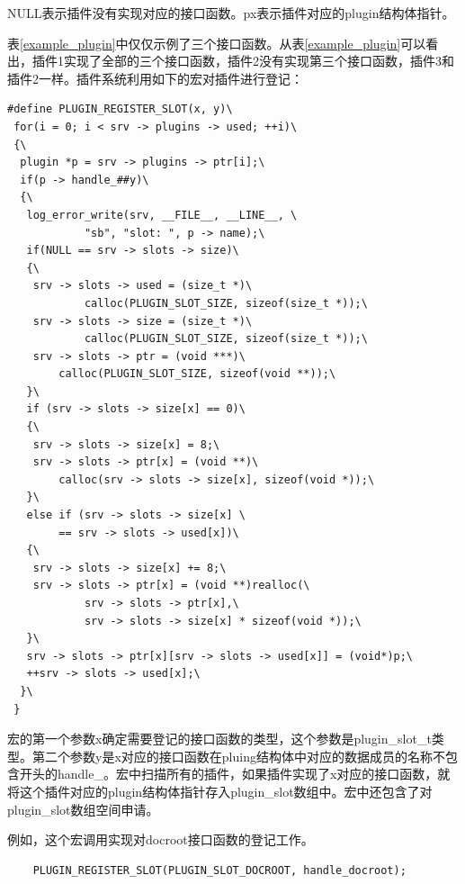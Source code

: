 \documentclass[twoside, xetex]{report}
\begin{document}
	NULL表示插件没有实现对应的接口函数。px表示插件对应的plugin结构体指针。
	
	表\ref{example_plugin}中仅仅示例了三个接口函数。从表\ref{example_plugin}可以看出，插件1实现了全部的三个接口函数，插件2没有实现第三个接口函数，插件3和插件2一样。插件系统利用如下的宏对插件进行登记：
	
\begin{verbatim}
#define PLUGIN_REGISTER_SLOT(x, y)\
 for(i = 0; i < srv -> plugins -> used; ++i)\
 {\
  plugin *p = srv -> plugins -> ptr[i];\
  if(p -> handle_##y)\
  {\
   log_error_write(srv, __FILE__, __LINE__, \
   			"sb", "slot: ", p -> name);\
   if(NULL == srv -> slots -> size)\
   {\
    srv -> slots -> used = (size_t *)\
    		calloc(PLUGIN_SLOT_SIZE, sizeof(size_t *));\
    srv -> slots -> size = (size_t *)\
    		calloc(PLUGIN_SLOT_SIZE, sizeof(size_t *));\
	srv -> slots -> ptr = (void ***)\
		calloc(PLUGIN_SLOT_SIZE, sizeof(void **));\
   }\
   if (srv -> slots -> size[x] == 0)\
   {\
	srv -> slots -> size[x] = 8;\
	srv -> slots -> ptr[x] = (void **)\
		calloc(srv -> slots -> size[x], sizeof(void *));\
   }\
   else if (srv -> slots -> size[x] \
   		== srv -> slots -> used[x])\
   {\
	srv -> slots -> size[x] += 8;\
	srv -> slots -> ptr[x] = (void **)realloc(\
			srv -> slots -> ptr[x],\
			srv -> slots -> size[x] * sizeof(void *));\
   }\
   srv -> slots -> ptr[x][srv -> slots -> used[x]] = (void*)p;\
   ++srv -> slots -> used[x];\
  }\
 }
\end{verbatim}

	宏的第一个参数x确定需要登记的接口函数的类型，这个参数是plugin\_slot\_t类型。第二个参数y是x对应的接口函数在pluing结构体中对应的数据成员的名称不包含开头的handle\_。宏中扫描所有的插件，如果插件实现了x对应的接口函数，就将这个插件对应的plugin结构体指针存入plugin\_slot数组中。宏中还包含了对plugin\_slot数组空间申请。
	
	例如，这个宏调用实现对docroot接口函数的登记工作。
\begin{verbatim}
	PLUGIN_REGISTER_SLOT(PLUGIN_SLOT_DOCROOT, handle_docroot);
\end{verbatim}
\end{document}
